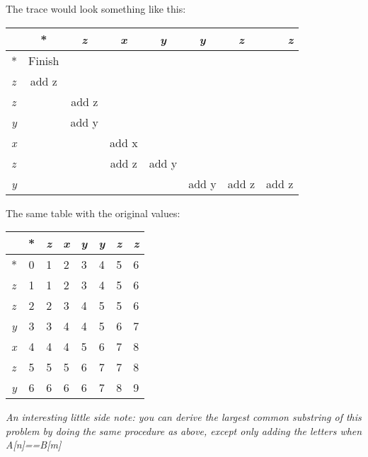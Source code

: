 \documentclass{article}
\begin{document}
\begin{enumerate}
\begin{enumerate}
The trace would look something like this: 

\begin{tabular}{| l | c | c | c | c | c | c | r | }
\hline
   	& * & \textit{z} & \textit{x} & \textit{y} & \textit{y} & \textit{z} & \textit{z} \\ \hline
  * 	& \cellcolor[gray]{0.8} Finish &   &   &   &   &   &   \\ \hline
\textit{z} & \cellcolor[gray]{0.8} add z &   &   &   &   &   &   \\ \hline
\textit{z} &   & \cellcolor[gray]{0.8} add z &   &   &   &   &   \\ \hline
\textit{y} &   & \cellcolor[gray]{0.8} add y &   &   &   &   &   \\ \hline
\textit{x} &   &   & \cellcolor[gray]{0.8} add x &   &   &   &   \\ \hline
\textit{z} &   &   & \cellcolor[gray]{0.8} add z & \cellcolor[gray]{0.8} add y &   &   &   \\ \hline
\textit{y} &   &   &   &   & \cellcolor[gray]{0.8}
 add y & \cellcolor[gray]{0.8} add z & \cellcolor[gray]{0.8} add z \\ \hline
\end{tabular}

The same table with the original values:

\begin{tabular}{| l | c | c | c | c | c | c | r | }
\hline
   	& * & \textit{z} & \textit{x} & \textit{y} & \textit{y} & \textit{z} & \textit{z} \\ \hline
  * 	   & \cellcolor[gray]{0.8} 0 & 1 & 2 & 3 & 4 & 5 & 6 \\ \hline
\textit{z} & \cellcolor[gray]{0.8} 1 & 1 & 2 & 3 & 4 & 5 & 6 \\ \hline
\textit{z} & 2 & \cellcolor[gray]{0.8} 2 & 3 & 4 & 5 & 5 & 6 \\ \hline
\textit{y} & 3 & \cellcolor[gray]{0.8} 3 & 4 & 4 & 5 & 6 & 7 \\ \hline
\textit{x} & 4 & 4 & \cellcolor[gray]{0.8} 4 & 5 & 6 & 7 & 8 \\ \hline
\textit{z} & 5 & 5 & \cellcolor[gray]{0.8} 5 & \cellcolor[gray]{0.8} 6 & 7 & 7 & 8 \\ \hline
\textit{y} & 6 & 6 & 6 & 6 & \cellcolor[gray]{0.8} 7 & \cellcolor[gray]{0.8} 8 & \cellcolor[gray]{0.8} 9 \\ \hline
\end{tabular}


\textit{An interesting little side note: you can derive the largest common substring of this problem by doing the same procedure as above, except only adding the letters when A[n]==B[m]}
\end{enumerate}
\end{enumerate}
\end{document}
